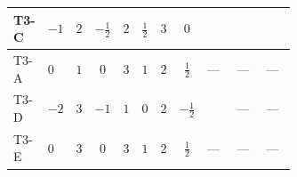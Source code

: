 \documentclass[8pt]{article}
\begin{document}
\begin{landscape}
\begin{longtable}{@{}llcccccc >{\raggedright\arraybackslash}p{0.21\linewidth} >{\raggedright\arraybackslash}p{0.21\linewidth} >{\raggedright\arraybackslash}p{0.21\linewidth}@{}}
\midrule
T3-C & $-1$ & $2$ & $-\frac{1}{2}$ & $2$ & $\frac{1}{2}$ & $3$ & $0$ & \scriptsize\adjustbox{max width=\linewidth}{$\begin{gathered} {\lambda_{H2}} (6 \operatorname{Tr}\!\left({Y_d}\,\left({Y_d}\right)^{\dagger}\right)+2 \operatorname{Tr}\!\left({Y_e}\,\left({Y_e}\right)^{\dagger}\right)+6 \operatorname{Tr}\!\left({Y_u}\,\left({Y_u}\right)^{\dagger}\right))\end{gathered}$} & \scriptsize\adjustbox{max width=\linewidth}{$\begin{gathered} +3 {\lambda_{S_1^\dagger S_2 S_2^{\dagger 2}}} \left({\lambda_{H H^\dagger S_1^\dagger S_2^\dagger}^{\rm Cross}}\right)^{*}\end{gathered}$} & \scriptsize\adjustbox{max width=\linewidth}{$\begin{gathered} +{\lambda_{H H^\dagger S_1^\dagger S_2^\dagger}^{\rm Cross}} (4 \left({\lambda_{H H^\dagger S_1^\dagger S_2^\dagger}^{\rm Cross}}\right)^{*}+3 \left({\lambda_{S_1^\dagger S_2 S_2^{\dagger 2}}}\right)^{*})\end{gathered}$} \\
\midrule
T3-A & $0$ & $1$ & $0$ & $3$ & $1$ & $2$ & $\frac{1}{2}$ & --- & --- & --- \\
\midrule
T3-D & $-2$ & $3$ & $-1$ & $1$ & $0$ & $2$ & $-\frac{1}{2}$ & \scriptsize\adjustbox{max width=\linewidth}{$\begin{gathered} {\lambda_{H2}} (6 \operatorname{Tr}\!\left({Y_d}\,\left({Y_d}\right)^{\dagger}\right)+2 \operatorname{Tr}\!\left({Y_e}\,\left({Y_e}\right)^{\dagger}\right)+6 \operatorname{Tr}\!\left({Y_u}\,\left({Y_u}\right)^{\dagger}\right))\end{gathered}$} & --- & --- \\
\midrule
T3-E & $0$ & $3$ & $0$ & $3$ & $1$ & $2$ & $\frac{1}{2}$ & --- & --- & --- \\
\midrule
\bottomrule
\end{longtable}
\clearpage

\end{landscape}
\end{document}
